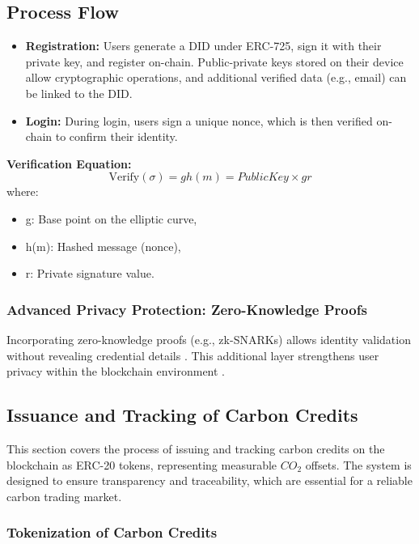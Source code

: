 \documentclass[preprint,12pt]{elsarticle}
\begin{document}
\subsection{Process Flow}
\begin{itemize}
    \item \textbf{Registration:} Users generate a DID under ERC-725, sign it with their private key, and register on-chain. Public-private keys stored on their device allow cryptographic operations, and additional verified data (e.g., email) can be linked to the DID.
    \item \textbf{Login:} During login, users sign a unique nonce, which is then verified on-chain to confirm their identity.
\end{itemize}
\textbf{Verification Equation:}
	\[\textrm{Verify}(\sigma)=gh(m)=Public Key \times gr\]
where:
\begin{itemize}
\item g: Base point on the elliptic curve,
\item h(m): Hashed message (nonce),
\item r: Private signature value.
\end{itemize}
\subsubsection{Advanced Privacy Protection: Zero-Knowledge Proofs}
Incorporating zero-knowledge proofs (e.g., zk-SNARKs) allows identity validation without revealing credential details \citep{parno2013snarks}. This additional layer strengthens user privacy within the blockchain environment \citep{sasson2014zerocash}.
\subsection{Issuance and Tracking of Carbon Credits}
This section covers the process of issuing and tracking carbon credits on the blockchain as ERC-20 tokens, representing measurable $CO_2$ offsets. The system is designed to ensure transparency and traceability, which are essential for a reliable carbon trading market.
\subsubsection{Tokenization of Carbon Credits}
\end{document}
